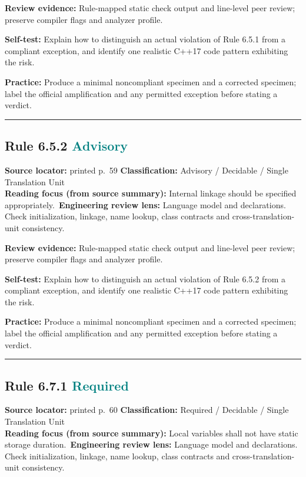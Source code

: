 \documentclass[10pt,letterpaper]{article}
\begin{document}
\textbf{Review evidence:} Rule-mapped static check output and line-level peer review; preserve compiler flags and analyzer profile.

\textbf{Self-test:} Explain how to distinguish an actual violation of Rule 6.5.1 from a compliant exception, and identify one realistic C++17 code pattern exhibiting the risk.\par
\textbf{Practice:} Produce a minimal noncompliant specimen and a corrected specimen; label the official amplification and any permitted exception before stating a verdict.
\smallskip\hrule\smallskip
\subsection*{Rule 6.5.2 \enspace \texorpdfstring{\small\textcolor{teal}{Advisory}}{Advisory}}
\noindent\textbf{Source locator:} printed p.~59 \quad\textbf{Classification:} Advisory / Decidable / Single Translation Unit\\
\textbf{Reading focus (from source summary):} Internal linkage should be specified appropriately.\
\textbf{Engineering review lens:} Language model and declarations. Check initialization, linkage, name lookup, class contracts and cross-translation-unit consistency.

\textbf{Review evidence:} Rule-mapped static check output and line-level peer review; preserve compiler flags and analyzer profile.

\textbf{Self-test:} Explain how to distinguish an actual violation of Rule 6.5.2 from a compliant exception, and identify one realistic C++17 code pattern exhibiting the risk.\par
\textbf{Practice:} Produce a minimal noncompliant specimen and a corrected specimen; label the official amplification and any permitted exception before stating a verdict.
\smallskip\hrule\smallskip
\subsection*{Rule 6.7.1 \enspace \texorpdfstring{\small\textcolor{teal}{Required}}{Required}}
\noindent\textbf{Source locator:} printed p.~60 \quad\textbf{Classification:} Required / Decidable / Single Translation Unit\\
\textbf{Reading focus (from source summary):} Local variables shall not have static storage duration.\
\textbf{Engineering review lens:} Language model and declarations. Check initialization, linkage, name lookup, class contracts and cross-translation-unit consistency.
\end{document}
